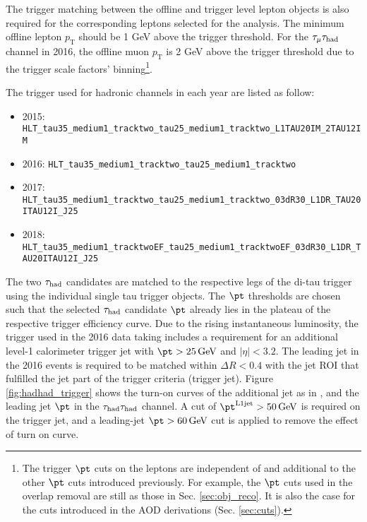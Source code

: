 The trigger matching between the offline and trigger level lepton objects is also required for the corresponding leptons selected for the analysis. The minimum offline lepton $p_{\text{T}}$ should be 1 GeV above the trigger threshold. For the $\tau_\mu{}\tau_\text{had}$ channel in 2016, the offline muon $p_{\text{T}}$ is 2 GeV above the trigger threshold due to the trigger scale factors' binning\footnote{The trigger $\pt$ cuts on the leptons are independent of and additional to the other $\pt$ cuts introduced previously. For example, the $\pt$ cuts used in the overlap removal are still as those in Sec. \ref{sec:obj_reco}. It is also the case for the cuts introduced in the AOD derivations (Sec. \ref{sec:cuts}).}.

The trigger used for hadronic channels in each year are listed as follow:
\begin{itemize}

\item 2015: \texttt{HLT\_tau35\_medium1\_tracktwo\_tau25\_medium1\_tracktwo\_L1TAU20IM\_2TAU12IM}
\item 2016: \texttt{HLT\_tau35\_medium1\_tracktwo\_tau25\_medium1\_tracktwo}
\item 2017: \texttt{HLT\_tau35\_medium1\_tracktwo\_tau25\_medium1\_tracktwo\_03dR30\_L1DR\_TAU20ITAU12I\_J25}
\item 2018: \texttt{HLT\_tau35\_medium1\_tracktwoEF\_tau25\_medium1\_tracktwoEF\_03dR30\_L1DR\_TAU20ITAU12I\_J25}

 \end{itemize}

The two $\tau_\text{had}$ candidates are matched to the respective legs of the di-tau trigger using the individual single tau trigger objects. The $\pt$ thresholds are chosen such that the selected $\tau_\text{had}$ candidate $\pt$ already lies in the plateau of the respective trigger efficiency curve. Due to the rising instantaneous luminosity, the trigger used in the 2016 data taking includes a requirement for an additional level-1 calorimeter trigger jet with $\pt > \SI{25}{\GeV}$ and $|\eta|<3.2$. The leading jet in the 2016 events is required to be matched within $\Delta R < 0.4$ with the jet ROI that fulfilled the jet part of the trigger criteria (trigger jet). Figure \ref{fig:hadhad_trigger} shows the turn-on curves of the additional jet as in \cite{Htautau}, and the leading jet $\pt$ in the $\tau_\text{had}{}\tau_\text{had}$ channel. A cut of $\pt^{\text{L1jet}} > \SI{50}{\GeV}$ is required on the trigger jet, and a leading-jet $\pt > \SI{60}{\GeV}$ cut is applied to remove the effect of turn on curve.

